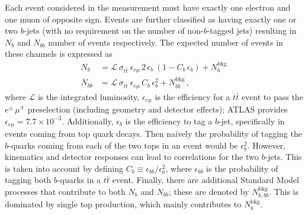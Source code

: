 \documentclass[a4paper,12pt]{article}
\newcommand{\Lc}{\mathcal{L}}
\begin{document}
Each event considered in the measurement must have exactly one electron and one muon of opposite sign. Events are further classified as having exactly one or two $b$-jets (with no requirement on the number of non-$b$-tagged jets) resulting in $N_b$ and $N_{bb}$ number of events respectively.  The expected number of events in these channels is expressed as
\begin{equation}
\begin{aligned}
N_b & = \Lc ~ \sigma_{t\bar{t}}~ \epsilon_{e\mu} \, 2 \, \epsilon_b ~(1-C_b \, \epsilon_b) + N_b^{\text{bkg}} \\[5pt]
N_{bb} & = \Lc ~ \sigma_{t\bar{t}}~ \epsilon_{e\mu} \, C_b \, \epsilon_b^2 + N_{bb}^{\text{bkg}}\,,
\label{eqn:N1N2}
\end{aligned}
\end{equation}
where $\Lc$ is the integrated luminosity, $ \epsilon_{e\mu}$ is the efficiency for a $t\bar{t}$ event to pass the $e^\pm\,\mu^\mp$ preselection (including geometry and detector effects); ATLAS provides $\epsilon_{e\mu} = 7.7 \times 10^{-3}$. Additionally, $\epsilon_b$ is the efficiency to tag a $b$-jet, specifically in events coming from top quark decays. Then naively the probability of tagging the $b$-quarks coming from each of the two tops in an event would be $\epsilon_b^2$. However, kinematics and detector responses can lead to correlations for the two $b$-jets. This is taken into account by defining $C_b \equiv \epsilon_{bb} / \epsilon_{b}^2$, where $\epsilon_{bb}$ is the probability of tagging both $b$-quarks in a $t\bar{t}$ event. Finally, there are additional Standard Model processes that contribute to both $N_b$ and $N_{bb}$; these are denoted by $N_{b,bb}^{\text{bkg}}$.  This is dominated by single top production, which mainly contributes to $N_b^{\text{bkg}}$. 
\end{document}
